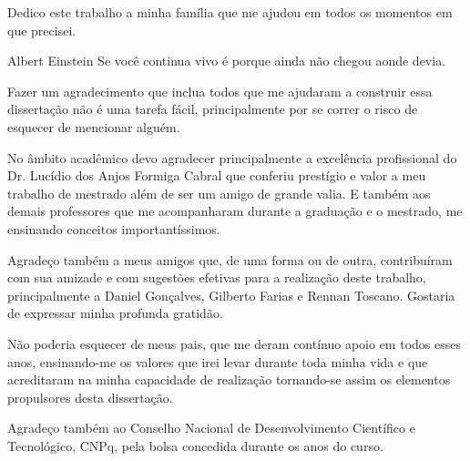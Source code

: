\documentclass[oneside,normaltoc,espacoumemeio,PGTEXdissertacao]{pgeeltex}
\begin{document}


\folhaderostoPGTEX
\folhadeaprovacaoPGTEX

%
\begin{dedicatoriaPGTEX}
Dedico este trabalho a minha família que me ajudou em todos os momentos em
que precisei.
\end{dedicatoriaPGTEX}




\begin{epigrafePGTEX}{Albert Einstein} 
Se você continua vivo é porque ainda não chegou aonde devia.
\end{epigrafePGTEX}


\begin{agradecimentosPGTEX}
Fazer um agradecimento que inclua todos que me ajudaram a construir
essa dissertação não é uma tarefa fácil, principalmente por se correr
o risco de esquecer de mencionar alguém.

No âmbito acadêmico devo agradecer principalmente a excelência profissional do
Dr. Lucídio dos Anjos Formiga Cabral que conferiu prestígio e valor a meu
trabalho de mestrado além de ser um amigo de grande valia. E também aos demais
professores que me acompanharam durante a graduação e o mestrado, me ensinando
conceitos importantíssimos.

Agradeço também a meus amigos que, de uma forma ou de outra,
contribuíram com sua amizade e com sugestões efetivas para a realização deste
trabalho, principalmente a Daniel Gonçalves, Gilberto Farias e Rennan Toscano. 
Gostaria de expressar minha profunda gratidão.

Não poderia esquecer de meus pais, que me deram contínuo apoio em todos esses
anos, ensinando-me os valores que irei levar durante toda minha vida e que
acreditaram na minha capacidade de realização tornando-se assim os elementos
propulsores desta dissertação. 

Agradeço também ao Conselho Nacional de Desenvolvimento Científico e
Tecnológico, CNPq, pela bolsa concedida durante os anos do curso.

\end{agradecimentosPGTEX}
\end{document}

